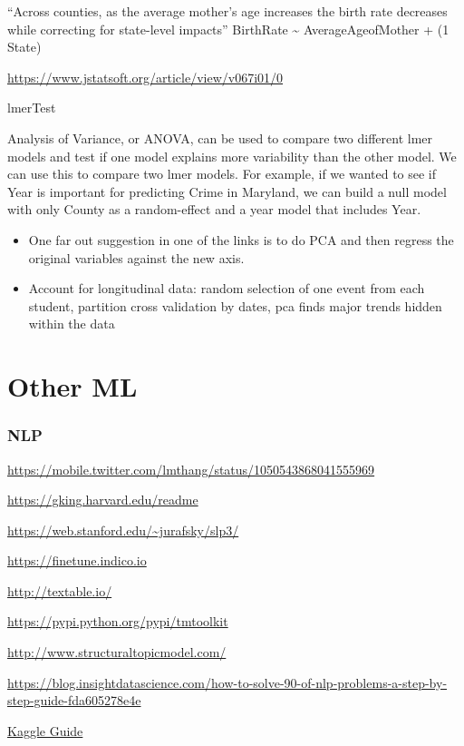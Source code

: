 \documentclass[]{book}
\begin{document}
``Across counties, as the average mother's age increases the birth rate decreases while correcting for state-level impacts'' BirthRate \textasciitilde{} AverageAgeofMother + (1 \textbar{} State)

\url{https://www.jstatsoft.org/article/view/v067i01/0}

lmerTest

Analysis of Variance, or ANOVA, can be used to compare two different lmer models and test if one model explains more variability than the other model. We can use this to compare two lmer models. For example, if we wanted to see if Year is important for predicting Crime in Maryland, we can build a null model with only County as a random-effect and a year model that includes Year.

\begin{itemize}
\item
  One far out suggestion in one of the links is to do PCA and then regress the original variables against the new axis.
\item
  Account for longitudinal data: random selection of one event from each student, partition cross validation by dates, pca finds major trends hidden within the data
\end{itemize}

\hypertarget{other-ml}{%
\section{Other ML}\label{other-ml}}

\hypertarget{nlp}{%
\subsubsection{NLP}\label{nlp}}

\url{https://mobile.twitter.com/lmthang/status/1050543868041555969}

\url{https://gking.harvard.edu/readme}

\url{https://web.stanford.edu/~jurafsky/slp3/}

\url{https://finetune.indico.io}

\url{http://textable.io/}

\url{https://pypi.python.org/pypi/tmtoolkit}

\url{http://www.structuraltopicmodel.com/}

\url{https://blog.insightdatascience.com/how-to-solve-90-of-nlp-problems-a-step-by-step-guide-fda605278e4e}

\href{https://t.co/Zcnd7EJKsn}{Kaggle Guide}
\end{document}
